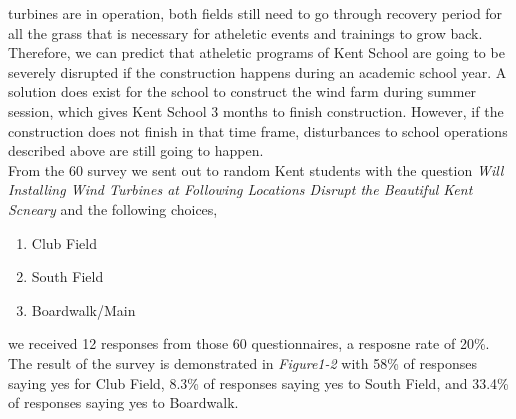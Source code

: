 \documentclass[review]{elsarticle}
\begin{document}
turbines are in operation, both fields still need to go through recovery period for all the grass that is necessary for atheletic events and trainings to grow back. Therefore, we 
can predict that atheletic programs of Kent School are going to be severely disrupted if the construction happens during an academic school year. A solution does exist for the school 
to construct the wind farm during summer session, which gives Kent School 3 months to finish construction. However, if the construction does not finish in that time frame, disturbances 
to school operations described above are still going to happen. %
\\\indent From the 60 survey we sent out to random Kent students with the question \textit{Will Installing Wind Turbines at Following Locations Disrupt the Beautiful Kent Scneary} 
and the following choices,

\begin{enumerate}
    \item Club Field
    \item South Field
    \item Boardwalk/Main
\end{enumerate}
we received 12 responses from those 60 questionnaires, a resposne rate of 20\%. The result of the survey is demonstrated in \textit{Figure1-2} with 58\% of responses saying yes 
for Club Field, 8.3\% of responses saying yes to South Field, and 33.4\% of responses saying yes to Boardwalk.
\\


        
\end{document}
